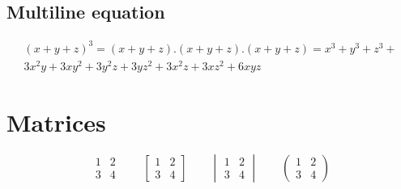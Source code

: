 \documentclass[12pt, a4paper]{article}
\begin{document}
\subsection{Multiline equation}

\begin{multline}
  (x + y + z)^{3} = (x + y + z).(x + y + z).(x + y + z) = x^{3} + y^{3} + z^{3} + \\
  3x^{2}y + 3xy^{2} + 3y^{2}z + 3yz^{2} + 3x^{2}z + 3xz^{2} + 6xyz
\end{multline}

\section{Matrices}

\[
\begin{matrix} 1 & 2 \\ 3 & 4 \end{matrix} \qquad
\begin{bmatrix} 1 & 2 \\ 3 & 4 \end{bmatrix} \qquad
\begin{vmatrix} 1 & 2 \\ 3 & 4 \end{vmatrix} \qquad
\begin{pmatrix} 1 & 2 \\ 3 & 4 \end{pmatrix}
\]
\end{document}
